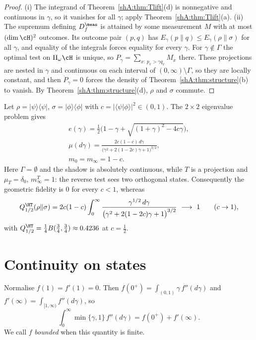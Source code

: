 \begin{proof}
(i) The integrand of Theorem~\ref{shA:thm:Tlift}(d) is nonnegative and continuous in $\gamma$, so it vanishes for all $\gamma$; apply Theorem~\ref{shA:thm:Tlift}(a). (ii) The supremum defining $D^\meas_f$ is attained by some measurement $M$ with at most $(\dim\cH)^2$ outcomes. Its outcome pair $(p,q)$ has $E_\gamma(p\|q)\le E_\gamma(\rho\|\sigma)$ for all $\gamma$, and equality of the integrals forces equality for every $\gamma$. For $\gamma\notin\Gamma$ the optimal test on $\Pi_\omega\cH$ is unique, so $P_\gamma=\sum_{x:\,p_x>\gamma q_x}M_x$ there. These projections are nested in $\gamma$ and continuous on each interval of $(0,\infty)\setminus\Gamma$, so they are locally constant, and then $\dot P_\gamma=0$ forces the density of Theorem~\ref{shA:thm:structure}(b) to vanish. By Theorem~\ref{shA:thm:structure}(d), $\rho$ and $\sigma$ commute.
\end{proof}

\begin{example}\label{shA:ex:pure}
Let $\rho=|\psi\rangle\langle\psi|$, $\sigma=|\phi\rangle\langle\phi|$ with $c=|\langle\psi|\phi\rangle|^2\in(0,1)$. The $2\times2$ eigenvalue problem gives
\begin{gather*}
e(\gamma)=\tfrac12\Big(1-\gamma+\sqrt{(1+\gamma)^2-4c\gamma}\Big),\\
 \mu(d\gamma)=\frac{2c(1-c)\,d\gamma}{\big(\gamma^2+2(1-2c)\gamma+1\big)^{3/2}},\\
 m_0=m_\infty=1-c .
\end{gather*}
Here $\Gamma=\emptyset$ and the shadow is absolutely continuous, while $T$ is a projection and $\mu_T=\delta_0$, $m^T_\infty=1$: the reverse test sees two orthogonal states. Consequently the geometric fidelity is $0$ for every $c<1$, whereas
\[
Q^\HT_{1/2}(\rho\|\sigma)=2c(1-c)\int_0^\infty\frac{\gamma^{1/2}\,d\gamma}{\big(\gamma^2+2(1-2c)\gamma+1\big)^{3/2}}\ \longrightarrow\ 1\qquad(c\to1),
\]
with $Q^\HT_{1/2}=\tfrac14B(\tfrac34,\tfrac34)\approx0.4236$ at $c=\tfrac12$.
\end{example}

\section{Continuity on states}\label{shA:sec:continuity}

Normalise $f(1)=f'(1)=0$. Then $f(0^+)=\int_{(0,1)}\gamma\,f''(d\gamma)$ and $f'(\infty)=\int_{[1,\infty)}f''(d\gamma)$, so
\begin{equation}\label{shA:eq:size}
\int_0^\infty\min\{\gamma,1\}\,f''(d\gamma)=f(0^+)+f'(\infty).
\end{equation}
We call $f$ \emph{bounded} when this quantity is finite.

